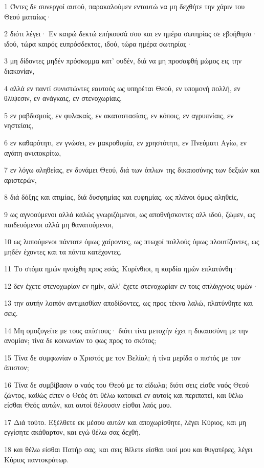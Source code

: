 \par 1 Όντες δε συνεργοί αυτού, παρακαλούμεν ενταυτώ να μη δεχθήτε την χάριν του Θεού ματαίως·
\par 2 διότι λέγει· Εν καιρώ δεκτώ επήκουσά σου και εν ημέρα σωτηρίας σε εβοήθησα· ιδού, τώρα καιρός ευπρόσδεκτος, ιδού, τώρα ημέρα σωτηρίας·
\par 3 μη δίδοντες μηδέν πρόσκομμα κατ' ουδέν, διά να μη προσαφθή μώμος εις την διακονίαν,
\par 4 αλλά εν παντί συνιστώντες εαυτούς ως υπηρέται Θεού, εν υπομονή πολλή, εν θλίψεσιν, εν ανάγκαις, εν στενοχωρίαις,
\par 5 εν ραβδισμοίς, εν φυλακαίς, εν ακαταστασίαις, εν κόποις, εν αγρυπνίαις, εν νηστείαις,
\par 6 εν καθαρότητι, εν γνώσει, εν μακροθυμία, εν χρηστότητι, εν Πνεύματι Αγίω, εν αγάπη ανυποκρίτω,
\par 7 εν λόγω αληθείας, εν δυνάμει Θεού, διά των όπλων της δικαιοσύνης των δεξιών και αριστερών,
\par 8 διά δόξης και ατιμίας, διά δυσφημίας και ευφημίας, ως πλάνοι όμως αληθείς,
\par 9 ως αγνοούμενοι αλλά καλώς γνωριζόμενοι, ως αποθνήσκοντες αλλ ιδού, ζώμεν, ως παιδευόμενοι αλλά μη θανατούμενοι,
\par 10 ως λυπούμενοι πάντοτε όμως χαίροντες, ως πτωχοί πολλούς όμως πλουτίζοντες, ως μηδέν έχοντες και τα πάντα κατέχοντες.
\par 11 Το στόμα ημών ηνοίχθη προς εσάς, Κορίνθιοι, η καρδία ημών επλατύνθη·
\par 12 δεν έχετε στενοχωρίαν εν ημίν, αλλ' έχετε στενοχωρίαν εν τοις σπλάγχνοις υμών·
\par 13 την αυτήν λοιπόν αντιμισθίαν αποδίδοντες, ως προς τέκνα λαλώ, πλατύνθητε και σεις.
\par 14 Μη ομοζυγείτε με τους απίστους· διότι τίνα μετοχήν έχει η δικαιοσύνη με την ανομίαν; τίνα δε κοινωνίαν το φως προς το σκότος;
\par 15 Τίνα δε συμφωνίαν ο Χριστός με τον Βελίαλ; ή τίνα μερίδα ο πιστός με τον άπιστον;
\par 16 Τίνα δε συμβίβασιν ο ναός του Θεού με τα είδωλα; διότι σεις είσθε ναός Θεού ζώντος, καθώς είπεν ο Θεός ότι θέλω κατοικεί εν αυτοίς και περιπατεί, και θέλω είσθαι Θεός αυτών, και αυτοί θέλουσιν είσθαι λαός μου.
\par 17 Διά τούτο. Εξέλθετε εκ μέσου αυτών και αποχωρίσθητε, λέγει Κύριος, και μη εγγίσητε ακάθαρτον, και εγώ θέλω σας δεχθή,
\par 18 και θέλω είσθαι Πατήρ σας, και σεις θέλετε είσθαι υιοί μου και θυγατέρες, λέγει Κύριος παντοκράτωρ.

